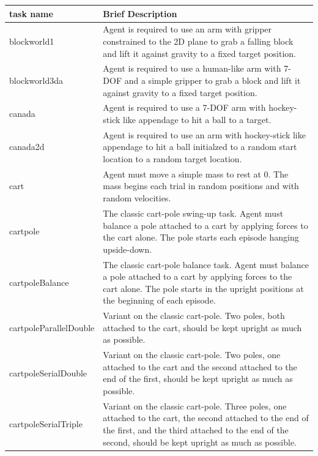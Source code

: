 \documentclass{article} %
\begin{document}
\setlength{\extrarowheight}{10pt}
\begin{center}
  \begin{longtable}{ l | p{10cm} }
  \textbf{task name } &  \textbf{Brief Description} \\
      \hline
blockworld1                  & Agent is required to use an arm with gripper constrained to the 2D plane to grab a falling block and lift it against gravity to a fixed target position. \\
blockworld3da                & Agent is required to use a human-like arm with 7-DOF and a simple gripper to grab a block and lift it against gravity to a fixed target position. \\
canada                       & Agent is required to use a 7-DOF arm with hockey-stick like appendage to hit a ball to a target. \\
canada2d                     & Agent is required to use an arm with hockey-stick like appendage to hit a ball initialzed to a random start location to a random target location. \\
cart                         & Agent must move a simple mass to rest at 0.  The mass begins each trial in random positions and with random velocities. \\
cartpole                     & The classic cart-pole swing-up task.  Agent must balance a pole attached to a cart by applying forces to the cart alone.  The pole starts each episode hanging upside-down.   \\
cartpoleBalance              & The classic cart-pole balance task.  Agent must balance a pole attached to a cart by applying forces to the cart alone.  The pole starts in the upright positions at the beginning of each episode. \\
cartpoleParallelDouble       & Variant on the classic cart-pole.  Two poles, both attached to the cart, should be kept upright as much as possible. \\
cartpoleSerialDouble         & Variant on the classic cart-pole.  Two poles, one attached to the cart and the second attached to the end of the first, should be kept upright as much as possible. \\
cartpoleSerialTriple         & Variant on the classic cart-pole.  Three poles, one attached to the cart, the second attached to the end of the first, and the third attached to the end of the second, should be kept upright as much as possible. \\

\end{longtable}
\end{center}
\end{document}
